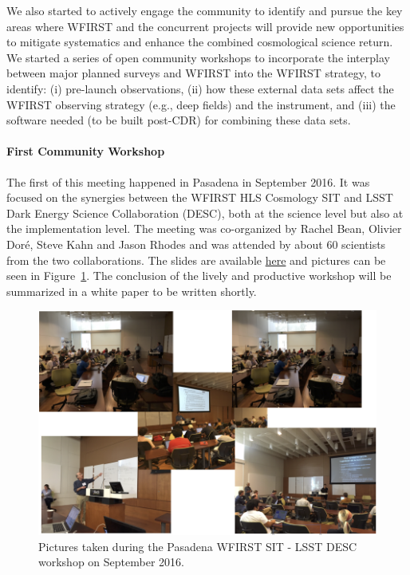 
We also started to actively engage the community to identify and pursue the key areas
where WFIRST and the concurrent projects will provide new opportunities to
mitigate systematics and enhance the combined cosmological science return. We
started a series of open community workshops to incorporate the interplay
between major planned surveys and WFIRST into the WFIRST strategy, to identify:
(i) pre-launch observations, (ii) how these external data sets affect the WFIRST
observing strategy (e.g., deep fields) and the instrument, and (iii) the
software needed (to be built post-CDR) for combining these data sets.

\paragraph*{First Community Workshop} The first of this meeting happened in
Pasadena in September 2016. It was focused on the synergies between the WFIRST
HLS Cosmology SIT and LSST Dark Energy Science Collaboration (DESC), both at the
science level but also at the implementation level. The meeting was co-organized
by Rachel Bean, Olivier Dor\'e, Steve Kahn and Jason Rhodes and was attended by
about 60 scientists from the two collaborations. The slides are available
\href{https://conference.ipac.caltech.edu/wfirst_lsst/}{here} and pictures can
be seen in Figure~\ref{fig:pic_workshop}. The conclusion of the lively and
productive workshop will be summarized in a white paper to be written shortly.

\begin{figure}
\includegraphics[width=\textwidth,angle=0]{Plots/pic_workshop.png}
\caption{\label{fig:pic_workshop}Pictures taken during the Pasadena WFIRST SIT - LSST DESC workshop on September 2016.}
\end{figure}

